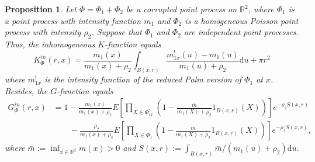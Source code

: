 \documentclass[11pt,a4paper,oneside]{article}
\newcommand{\indicator}{\ensuremath{{1}}}
\newcommand{\dd}{\mathrm d}
\newcommand{\E}{E}
\newcommand{\R}{\mathbb{R}}
\newtheorem{proposition}{Proposition}
\theoremstyle{definition}
\theoremstyle{remark}
\begin{document}
\begin{proposition}
    Let $\Phi= \Phi_1+ \Phi_2$ be a corrupted point process on $\R^2$, where $\Phi_1$ is a point process with intensity function $m_1$ and $\Phi_2$ is a homogeneous Poisson point process with intensity $\rho_2$. Suppose that $\Phi_1$ and $\Phi_2$ are independent point processes. Thus, the inhomogeneous $K$-function equals
    \begin{equation}
        K_{\Phi}^{in} (r,x)  =\frac{m_{1} (x) }{m_{1} (x)+ \rho_2} \int_{B(x, r)} \frac{m_{1x}^! (u) - m_1 (u) }{m_{1}(u)+ \rho_2} \dd u  + \pi r^2\label{eq:K_ino_superosed}  
    \end{equation}
    where $m_{1x}^!$ is the intensity function of the reduced Palm version  of $\Phi_1$ at $x$. Besides,  the  $G$-function equals
    \begin{equation} \label{eq:G_ino_superposed}
        \begin{split}
             G^{in}_{\Phi}(r,x)  & = 1- \frac{m_1 (x)}{m_1 (x) + \rho_2}  \E \left[  \prod_{X \in \Phi^{!}_{1x}} \left(1- \frac{\bar m}{m_1 (X)+ \rho_2} \indicator_{B (x, r)}(X)  \right)\right] e^{- \rho_2 S (x, r)}\\
             & \qquad -
          \frac{\rho_2}{m_1 (x) + \rho_2}  \E \left[  \prod_{X \in \Phi_1} \left(1- \frac{\bar m}{m_1 (X)+ \rho_2} \indicator_{B (x, r)}(X)  \right)\right] e^{- \rho_2 S (x, r)},   
        \end{split}
    \end{equation}
    where $\bar m := \inf_{x \in \R^2}  m(x) >0$ and $S (x, r):= \int_{B (x, r)}  \bar m / (m_1 (u)+ \rho_2) \dd u$.
\end{proposition}
\end{document}
